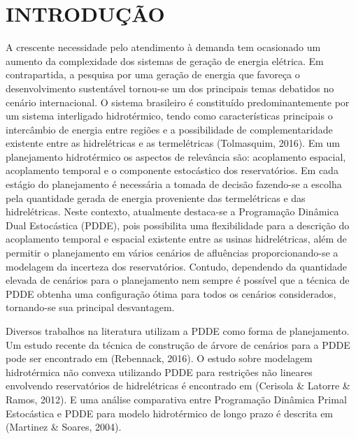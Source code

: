 \documentclass[12pt,fleqn]{article}
\begin{document}
\pagestyle{fancy}

\section{INTRODU\c C\~AO}
A crescente necessidade pelo atendimento \`a demanda tem ocasionado um aumento da complexidade dos
sistemas de gera\c c\~ao de energia el\'etrica. Em contrapartida, a pesquisa por uma gera\c c\~ao de energia que favore\c
ca o desenvolvimento sustent\'avel tornou-se um dos principais temas debatidos no cen\'ario internacional. O sistema brasileiro \'e constitu\'ido predominantemente por um sistema interligado
hidrot\'ermico, tendo como caracter\'isticas principais o interc\^ambio de energia entre regi\~oes e a possibilidade de
complementaridade existente entre as hidrel\'etricas e as termel\'etricas (Tolmasquim, 2016). Em um planejamento hidrot\'ermico os aspectos
de relev\^ancia s\~ao: acoplamento espacial, acoplamento temporal e o componente estoc\'astico dos reservat\'orios. Em cada
est\'agio do planejamento \'e necess\'aria a tomada de decis\~ao fazendo-se a escolha pela quantidade gerada de energia
proveniente das termel\'etricas e das hidrel\'etricas. Neste
contexto, atualmente destaca-se a Programa\c c\~ao Din\^amica Dual
Estoc\'astica (PDDE), pois possibilita uma flexibilidade para a descri\c c\~ao do acoplamento temporal e espacial existente entre as
usinas hidrel\'etricas, al\'em de permitir o  planejamento em v\'arios cen\'arios de aflu\^encias proporcionando-se a
modelagem da incerteza dos reservat\'orios. Contudo, dependendo da quantidade elevada de cen\'arios  para o planejamento
nem sempre \'e poss\'ivel que a t\'ecnica de PDDE obtenha uma configura\c c\~ao \'otima para todos os cen\'arios
considerados, tornando-se sua principal desvantagem.

Diversos trabalhos na literatura utilizam a PDDE como forma de planejamento. Um estudo recente da t\'ecnica
de constru\c c\~ao de \'arvore de cen\'arios para a PDDE pode ser encontrado em (Rebennack, 2016). O estudo sobre modelagem hidrot\'ermica n\~ao convexa utilizando PDDE para restri\c c\~oes n\~ao lineares envolvendo reservat\'orios de
hidrel\'etricas \'e encontrado em (Cerisola \& Latorre \& Ramos,
2012). E uma an\'alise comparativa entre Programa\c c\~ao Din\^amica Primal Estoc\'astica e PDDE para modelo
hidrot\'ermico de longo prazo \'e descrita em (Martinez \&
Soares, 2004). 
\end{document}
